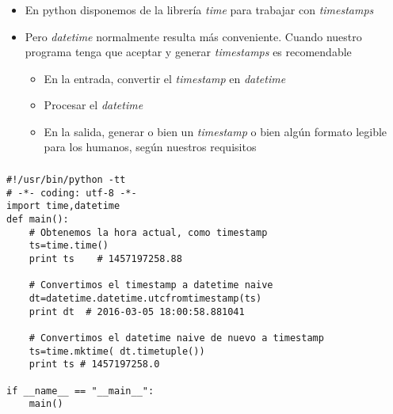 \documentclass[ucs]{beamer}
\begin{document}
\begin{frame}[fragile]
\frametitle{}
\begin{itemize}
\item
En python disponemos de la librería \emph{time} para trabajar con 
\emph{timestamps}
\item
Pero \emph{datetime} normalmente resulta más conveniente. Cuando nuestro
programa tenga que aceptar y generar 
\emph{timestamps} es recomendable

\begin{itemize}
\item
En la entrada, convertir el 
\emph{timestamp}
en 
\emph{datetime}
\item
Procesar el 
\emph{datetime}
\item
En la salida, generar o bien un 
\emph{timestamp}
o bien algún formato legible para los humanos, según nuestros requisitos
\end{itemize}

\end{itemize}

\end{frame}



\begin{frame}[fragile]
\frametitle{}

  \begin{footnotesize}
  \begin{verbatim}
#!/usr/bin/python -tt
# -*- coding: utf-8 -*-
import time,datetime
def main():
    # Obtenemos la hora actual, como timestamp
    ts=time.time()
    print ts    # 1457197258.88

    # Convertimos el timestamp a datetime naive
    dt=datetime.datetime.utcfromtimestamp(ts)
    print dt  # 2016-03-05 18:00:58.881041

    # Convertimos el datetime naive de nuevo a timestamp
    ts=time.mktime( dt.timetuple())
    print ts # 1457197258.0

if __name__ == "__main__":
    main()
  \end{verbatim}
  \end{footnotesize}

\end{frame}
\end{document}
